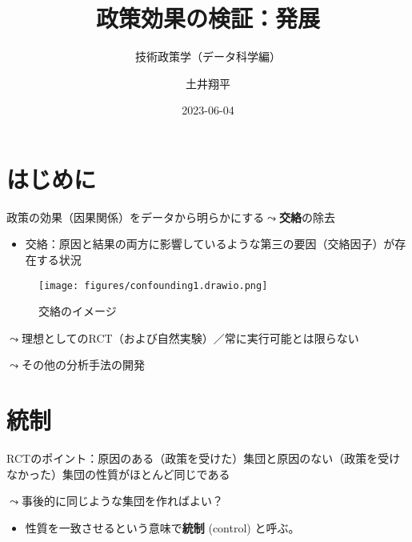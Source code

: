 \documentclass[
  xelatex,
  ja=standard]{bxjsarticle}
\title{政策効果の検証：発展}
\subtitle{技術政策学（データ科学編）}
\author{土井翔平}
\date{2023-06-04}
\providecommand{\tightlist}{%
  \setlength{\itemsep}{0pt}\setlength{\parskip}{0pt}}\usepackage{longtable,booktabs,array}
\begin{document}
\maketitle
\ifdefined\Shaded\renewenvironment{Shaded}{\begin{tcolorbox}[boxrule=0pt, sharp corners, interior hidden, borderline west={3pt}{0pt}{shadecolor}, breakable, frame hidden, enhanced]}{\end{tcolorbox}}\fi

\hypertarget{ux306fux3058ux3081ux306b}{%
\section*{はじめに}\label{ux306fux3058ux3081ux306b}}

政策の効果（因果関係）をデータから明らかにする\(\leadsto\)\textbf{交絡}の除去

\begin{itemize}
\tightlist
\item
  交絡：原因と結果の両方に影響しているような第三の要因（交絡因子）が存在する状況
\end{itemize}

\begin{figure}[htpb]

{\centering \texttt{[image: figures/confounding1.drawio.png]}

}

\caption{交絡のイメージ}

\end{figure}

\(\leadsto\)理想としてのRCT（および自然実験）／常に実行可能とは限らない

\(\leadsto\)その他の分析手法の開発

\hypertarget{ux7d71ux5236}{%
\section{統制}\label{ux7d71ux5236}}

RCTのポイント：原因のある（政策を受けた）集団と原因のない（政策を受けなかった）集団の性質がほとんど同じである

\(\leadsto\)事後的に同じような集団を作ればよい？

\begin{itemize}
\tightlist
\item
  性質を一致させるという意味で\textbf{統制} (control) と呼ぶ。
\end{itemize}
\end{document}
